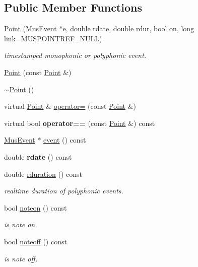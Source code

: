 \subsection*{Public Member Functions}
\begin{DoxyCompactItemize}
\item 
\mbox{\hyperlink{group__segment_ga6cb7f450eee39d3bd8483f017f28906d}{Point}} (\mbox{\hyperlink{classMusEvent}{Mus\+Event}} $\ast$e, double rdate, double rdur, bool on, long link=M\+U\+S\+P\+O\+I\+N\+T\+R\+E\+F\+\_\+\+N\+U\+LL)
\begin{DoxyCompactList}\small\item\em timestamped monophonic or polyphonic event. \end{DoxyCompactList}\item 
\mbox{\hyperlink{group__segment_ga5b7ec0fb127734c1cd5c6f350a3990fc}{Point}} (const \mbox{\hyperlink{classPoint}{Point}} \&)
\item 
\mbox{\hyperlink{group__segment_ga395fa04b4ec126b66fc053f829a30cc1}{$\sim$\+Point}} ()
\item 
virtual \mbox{\hyperlink{classPoint}{Point}} \& \mbox{\hyperlink{group__segment_ga55eeab949e62268da63176d48570eb54}{operator=}} (const \mbox{\hyperlink{classPoint}{Point}} \&)
\item 
virtual bool {\bfseries operator==} (const \mbox{\hyperlink{classPoint}{Point}} \&) const
\item 
\mbox{\hyperlink{classMusEvent}{Mus\+Event}} $\ast$ \mbox{\hyperlink{classPoint_acf6506d97b9e96f177e1830a546e3ea3}{event}} () const
\item 
\mbox{\label{classPoint_ad2ff6ece321bae579ab2d4f52c71bb31}} 
double {\bfseries rdate} () const
\item 
double \mbox{\hyperlink{classPoint_a21ee97f153dd1c435f7d2e554887294f}{rduration}} () const
\begin{DoxyCompactList}\small\item\em realtime duration of polyphonic events. \end{DoxyCompactList}\item 
\mbox{\label{classPoint_a21d3017c2e04de4cc602306bafa40239}} 
bool \mbox{\hyperlink{classPoint_a21d3017c2e04de4cc602306bafa40239}{noteon}} () const
\begin{DoxyCompactList}\small\item\em is note on. \end{DoxyCompactList}\item 
\mbox{\label{classPoint_a951d10365297b7a1a2dd1bb51100e076}} 
bool \mbox{\hyperlink{classPoint_a951d10365297b7a1a2dd1bb51100e076}{noteoff}} () const
\begin{DoxyCompactList}\small\item\em is note off. \end{DoxyCompactList}\end{DoxyCompactItemize}
